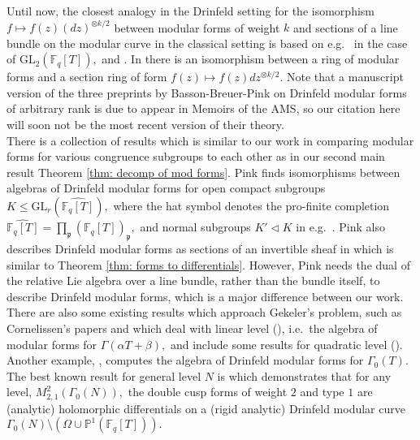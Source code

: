 \documentclass[11pt]{amsart}
\theoremstyle{definition}
\numberwithin{equation}{section}
\newcommand{\GL}{\mathrm{GL}} 	%
\newcommand{\bbF}{\mathbb{F}}		%
\newcommand{\bbP}{\mathbb{P}}		%
\begin{document}
		Until now, the closest analogy in the Drinfeld setting for the isomorphism $f\mapsto f(z)(dz)^{\otimes k/2}$ between modular forms of weight $k$ and sections of a line bundle on the modular curve in the classical setting is based on e.g.\ \cite[Page $52$]{Gekeler-Curves} in the case of $\GL_2(\bbF_q[T]),$ and \cite[Definition $(10.1)$]{Basson-Breuer-Pink-part2}. In \cite[Lemma $(10.7)$]{Basson-Breuer-Pink-part2} there is an isomorphism between a ring of modular forms and a section ring of form $f(z)\mapsto f(z)dz^{\otimes k/2}.$ Note that a manuscript version of the three preprints by Basson-Breuer-Pink on Drinfeld modular forms of arbitrary rank is due to appear in Memoirs of the AMS, so our citation here will soon not be the most recent version of their theory.\\ 
		
		There is a collection of results which is similar to our work in comparing modular forms for various congruence subgroups to each other as in our second main result Theorem \ref{thm: decomp of mod forms}. Pink finds isomorphisms between algebras of Drinfeld modular forms for open compact subgroups $K\leq \GL_r(\widehat{\bbF_q[T]}),$ where the hat symbol denotes the pro-finite completion $\widehat{\bbF_q[T]}=\prod_{\mathfrak{p}} (\bbF_q[T])_{\mathfrak{p}},$ and normal subgroups $K'\lhd K$ in e.g.\ \cite[Proposition $5.5$]{Pink-compactification-Drinfeld-modular-varieties-2012}. Pink also describes Drinfeld modular forms as sections of an invertible sheaf in \cite[Section $5$]{Pink-compactification-Drinfeld-modular-varieties-2012} which is similar to Theorem \ref{thm: forms to differentials}. However, Pink needs the dual of the relative Lie algebra over a line bundle, rather than the bundle itself, to describe Drinfeld modular forms, which is a major difference between our work.\\
		
		There are also some existing results which approach Gekeler's problem, such as Cornelissen's papers \cite{Cornelissen-lvlT} and \cite{Cornelissen-wt1} which deal with linear level (\cite[Theorem $(3.3)$]{Cornelissen-wt1}), i.e.\ the algebra of modular forms for $\Gamma(\alpha T+\beta),$ and include some results for quadratic level (\cite[Proposition $(3.4)$]{Cornelissen-wt1}). 
		Another example, \cite[Theorem $(4.4)$]{Dalal-Kumar-Gamma_0(T)-structure}, computes the algebra of Drinfeld modular forms for $\Gamma_0(T).$ The best known result for general level $N$ is \cite[Proposition $4.16$]{Armana-thesis} which demonstrates that for any level, $M^2_{2,1}(\Gamma_0(N)),$ the double cusp forms of weight $2$ and type $1$ are (analytic) holomorphic differentials on a (rigid analytic) Drinfeld modular curve $\Gamma_0(N)\setminus(\Omega\cup \bbP^1(\bbF_q[T])).$\\
		
\end{document}
